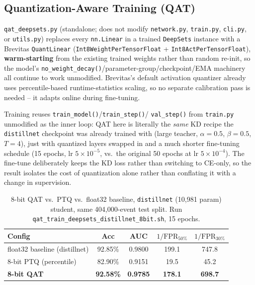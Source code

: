 \subsection{Quantization-Aware Training (QAT)}
\label{sec:deepsets-qat}

\texttt{qat\_deepsets.py} (standalone; does not modify \texttt{network.py},
\texttt{train.py}, \texttt{cli.py}, or \texttt{utils.py}) replaces every
\texttt{nn.Linear} in a trained \texttt{DeepSets} instance with a Brevitas
\texttt{QuantLinear} (\texttt{Int8WeightPerTensorFloat} +
\texttt{Int8ActPerTensorFloat}), \textbf{warm-starting} from the existing
trained weights rather than random re-init, so the model's
\texttt{no\_weight\_decay()}/parameter-group/checkpoint/EMA machinery all
continue to work unmodified. Brevitas's default activation quantizer already
uses percentile-based runtime-statistics scaling, so no separate calibration
pass is needed -- it adapts online during fine-tuning.

Training reuses \texttt{train\_model()}/\texttt{train\_step()}/
\texttt{val\_step()} from \texttt{train.py} unmodified as the inner loop: QAT
here is literally the \emph{same} KD recipe the \texttt{distillnet} checkpoint
was already trained with (large teacher, $\alpha{=}0.5$, $\beta{=}0.5$,
$T{=}4$), just with quantized layers swapped in and a much shorter
fine-tuning schedule (15 epochs, lr $5\times10^{-5}$, vs.\ the original 50
epochs at lr $5\times10^{-4}$). The fine-tune deliberately keeps the KD loss
rather than switching to CE-only, so the result isolates the cost of
quantization alone rather than conflating it with a change in supervision.

\begin{table}[h]
    \centering
    \small
    \begin{tabular}{lcccc}
        \toprule
        Config & Acc & AUC & $1/\mathrm{FPR}_{50\%}$ & $1/\mathrm{FPR}_{30\%}$ \\
        \midrule
        float32 baseline (distillnet) & 92.85\% & 0.9800 & 199.1 & 747.8 \\
        8-bit PTQ (percentile)        & 82.90\% & 0.9151 & 19.5  & 45.2  \\
        \textbf{8-bit QAT}            & \textbf{92.58\%} & \textbf{0.9785} & \textbf{178.1} & \textbf{698.7} \\
        \bottomrule
    \end{tabular}
    \caption{8-bit QAT vs.\ PTQ vs.\ float32 baseline, \texttt{distillnet}
    (10{,}981 param) student, same 404{,}000-event test split. Run
    \texttt{qat\_train\_deepsets\_distillnet\_8bit.sh}, 15 epochs.}
    \label{tab:deepsets-qat}
\end{table}

